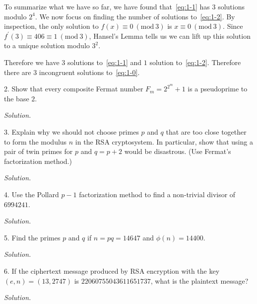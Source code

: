 \documentclass{article}
\newcommand{\Mod}[1]{\ (\mathrm{mod}\ #1)}
\begin{document}
To summarize what we have so far, we have found that~\eqref{eq:1-1} has
$3$ solutions modulo $2^4$. We now focus on finding the number of solutions
to~\eqref{eq:1-2}. By inspection, the only solution to $f(x) \equiv 0 \Mod 3$
is $x \equiv 0 \Mod 3$. Since $f^\prime(3) \equiv 406 \equiv 1 \Mod 3$,
Hansel's Lemma tells us we can lift up this solution to a unique solution
modulo $3^2$.

Therefore we have $3$ solutions to~\eqref{eq:1-1} and $1$ solution
to~\eqref{eq:1-2}. Therefore there are $3$ incongruent solutions
to~\eqref{eq:1-0}.



\newpage

2. Show that every composite Fermat number $F_m = 2^{2^m} + 1$ is a
pseudoprime to the base $2$.

\textit{Solution.}

\newpage

3. Explain why we should not choose primes $p$ and $q$ that are too close
together to form the modulus $n$ in the RSA cryptosystem. In particular,
show that using a pair of twin primes for $p$ and $q = p + 2$ would be
disastrous. (Use Fermat's factorization method.)

\textit{Solution.}

\newpage

4. Use the Pollard $p - 1$ factorization method to find a non-trivial
divisor of $6994241$.

\textit{Solution.}

\newpage

5. Find the primes $p$ and $q$ if $n = p q = 14647$ and $\phi(n) = 14400$.

\textit{Solution.}

\newpage

6. If the ciphertext message produced by RSA encryption with the key
$(e, n) = (13, 2747)$ is $22060755043611651737$, what is the plaintext
message?

\textit{Solution.}
\end{document}
